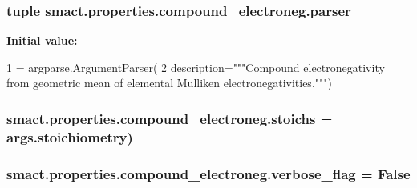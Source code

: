 \subsubsection[{parser}]{\setlength{\rightskip}{0pt plus 5cm}tuple smact.\+properties.\+compound\+\_\+electroneg.\+parser}\label{namespacesmact_1_1properties_1_1compound__electroneg_a37c9645aeda095ca168aab4473ffaf08}
{\bfseries Initial value\+:}
\begin{DoxyCode}
1 = argparse.ArgumentParser(
2         description=\textcolor{stringliteral}{"""Compound electronegativity from geometric mean of                       elemental
       Mulliken electronegativities."""})
\end{DoxyCode}
\hypertarget{namespacesmact_1_1properties_1_1compound__electroneg_a9aba72c1028841fd2e02ce29beba3f95}{}
\subsubsection[{stoichs}]{\setlength{\rightskip}{0pt plus 5cm}smact.\+properties.\+compound\+\_\+electroneg.\+stoichs = args.\+stoichiometry)}\label{namespacesmact_1_1properties_1_1compound__electroneg_a9aba72c1028841fd2e02ce29beba3f95}
\hypertarget{namespacesmact_1_1properties_1_1compound__electroneg_a826aa7e85fedf31d7c07412fed4d3c35}{}
\subsubsection[{verbose\+\_\+flag}]{\setlength{\rightskip}{0pt plus 5cm}smact.\+properties.\+compound\+\_\+electroneg.\+verbose\+\_\+flag = False}\label{namespacesmact_1_1properties_1_1compound__electroneg_a826aa7e85fedf31d7c07412fed4d3c35}
